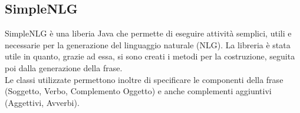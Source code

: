 \subsection{SimpleNLG}
SimpleNLG è una liberia Java che permette di eseguire attività semplici, utili e necessarie per la generazione del linguaggio naturale (NLG). La libreria è stata utile in quanto, grazie ad essa, si sono creati i metodi per la costruzione, seguita poi dalla generazione della frase.\\
Le classi utilizzate permettono inoltre di specificare le componenti della frase (Soggetto, Verbo, Complemento Oggetto) e anche complementi aggiuntivi (Aggettivi, Avverbi).



